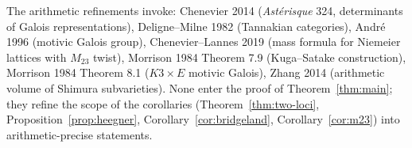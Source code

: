\begin{remark}
\label{rem:arithmetic-biblio}
The arithmetic refinements invoke: Chenevier 2014 (\emph{Astérisque} 324, determinants of Galois representations), Deligne--Milne 1982 (Tannakian categories), Andr\'e 1996 (motivic Galois group), Chenevier--Lannes 2019 (mass formula for Niemeier lattices with $M_{23}$ twist), Morrison 1984 Theorem 7.9 (Kuga--Satake construction), Morrison 1984 Theorem 8.1 ($K3 \times E$ motivic Galois), Zhang 2014 (arithmetic volume of Shimura subvarieties). None enter the proof of Theorem~\ref{thm:main}; they refine the scope of the corollaries (Theorem~\ref{thm:two-loci}, Proposition~\ref{prop:heegner}, Corollary~\ref{cor:bridgeland}, Corollary~\ref{cor:m23}) into arithmetic-precise statements.
\end{remark}
